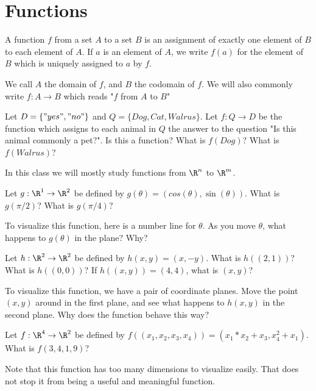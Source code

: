 
\section{Functions}

\begin{definition}
A function $f$ from a set $A$ to a set $B$ is an assignment of exactly one element of $B$ to each element of $A$.  If $a$ is an element of $A$, we write $f(a)$ for the element of 
$B$ which is uniquely assigned to $a$ by $f$. 
\end{definition}

We call $A$ the domain of $f$, and $B$ the codomain of $f$.  We will also commonly write $f:A \to B$ which reads "$f$ from $A$ to $B$"

\begin{question}
Let  $D =\{ "yes","no"\}$ and $Q = \{ Dog, Cat, Walrus\}$.  Let $f:Q \to D$ be the function which assigns to each animal in $Q$ the answer to the question "Is this animal commonly a pet?".
Is this a function?
What is $f(Dog)$?
What is $f(Walrus)$?
\end{question}

In this class we will mostly study functions  from $\R^n$ to $\R^m$.

\begin{question}
	Let $g:\R^1 \to \R^2$ be defined by $g(\theta) = (cos(\theta),\sin(\theta))$.
What is $g(\pi/2)$?
What is $g(\pi/4)$?

To visualize this function, here is a number line for $\theta$.  As you move $\theta$, what happens to $g(\theta)$ in the plane?  Why?
\end{question}

\begin{question}
Let $h:\R^2 \to \R^2$ be defined by $h(x,y) = (x,-y)$.
What is $h((2,1))$?
What is $h((0,0))$?
If $h((x,y)) = (4,4)$, what is $(x,y)$?

To visualize this function, we have a pair of coordinate planes.  Move the point $(x,y)$ around in the first plane, and see what happens to $h(x,y)$
in the second plane.  Why does the function behave this way?
\end{question}

\begin{question}
Let $f:\R^4 \to \R^2$ be defined by $f((x_1,x_2,x_3,x_4)) = (x_1*x_2+x_3,x_4^2+x_1)$.
What is $f(3,4,1,9)$?

Note that this function has too many dimensions to visualize easily.  That does not stop it from being a useful and meaningful function.
\end{question}

